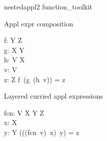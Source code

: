 \documentclass{article}
\begin{document}
\begin{zsection}
\SECTION nestedappl2 \parents function\_toolkit
\end{zsection}

\begin{zed}
   [X, Y, Z, V]
\end{zed}

Appl expr composition
\begin{axdef}
   f: Y \pfun Z \\
   g: X \pfun Y \\
   h: V \pfun X \\ 
   v: V \\
   z: Z
\where
   f~(g~(h~v)) = z  
\end{axdef}

Layered curried appl expressions
\begin{axdef}
  fcn: V \pfun X \pfun Y \pfun Z \\
  x: X \\
  y: Y
\where
   (((fcn~v)~x)~y) = z
\end{axdef}
\end{document}
